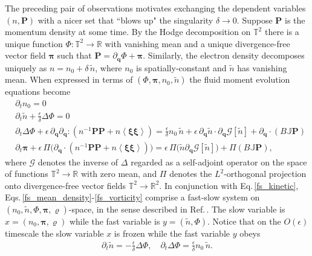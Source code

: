 \documentclass[%
 aip,
 amsmath,amssymb,
reprint, onecolumn %
]{revtex4-1}
\begin{document}
The preceding pair of observations motivates exchanging the dependent variables $(n,\bm{P})$ with a nicer set that ``blows up" the singularity $\delta\rightarrow 0$. Suppose $\bm{P}$ is the momentum density at some time. By the Hodge decomposition on $\mathbb{T}^2$ there is a unique function $\Phi:\mathbb{T}^2\rightarrow\mathbb{R}$ with vanishing mean and a unique divergence-free vector field $\bm{\pi}$ such that $\bm{P} =\partial_{\bm{q}}\Phi + \bm{\pi} $. Similarly, the electron density decomposes uniquely as $n = n_0 + \delta\,\widetilde{n}$, where $n_0$ is spatially-constant and $\widetilde{n}$ has vanishing mean. When expressed in terms of $(\Phi,\bm{\pi},n_0,\widetilde{n})$ the fluid moment evolution equations become
\begin{align}
&\partial_tn_0 = 0\label{fs_mean_density}\\
& \partial_t\widetilde{n} + \frac{\epsilon}{\delta}\Delta\Phi = 0\label{fs_continuity}\\
& \partial_t \Delta\Phi + \epsilon\,\partial_{\bm{q}}\partial_{\bm{q}}:(n^{-1}\bm{P}\bm{P} + n\left\langle\bm{\xi}\bm{\xi}\right\rangle) = \frac{\epsilon}{\delta}n_0\,\widetilde{n} + \epsilon\,\partial_{\bm{q}}\widetilde{n}\cdot \partial_{\bm{q}}\mathcal{G}[\widetilde{n}] + \partial_{\bm{q}}\cdot(B\mathbb{J}\bm{P})\label{fs_potential}\\
&\partial_t\bm{\pi} + \epsilon\,\Pi\bigg(\partial_{\bm{q}}\cdot(n^{-1}\bm{P}\bm{P} + n\left\langle \bm{\xi}\bm{\xi}\right\rangle)\bigg) = \epsilon\,\Pi\bigg(\widetilde{n}\partial_{\bm{q}}\mathcal{G}[\widetilde{n}]\bigg) + \Pi(B\mathbb{J}\bm{P}),\label{fs_vorticity}
\end{align}
where $\mathcal{G}$ denotes the inverse of $\Delta$ regarded as a self-adjoint operator on the space of functions $\mathbb{T}^2\rightarrow\mathbb{R}$ with zero mean, and $\Pi$ denotes the $L^2$-orthogonal projection onto divergence-free vector fields $\mathbb{T}^2\rightarrow\mathbb{R}^2$. In conjunction with Eq.\,\eqref{fs_kinetic}, Eqs.\,\eqref{fs_mean_density}-\eqref{fs_vorticity} comprise a fast-slow system on $(n_0,\widetilde{n},\Phi,\bm{\pi},\varrho)$-space, in the sense described in Ref.\,. The slow variable is $x=(n_0,\bm{\pi},\varrho)$ while the fast variable is $y = (\widetilde{n},\Phi)$. Notice that on the $O(\epsilon)$ timescale the slow variable $x$ is frozen while the fast variable $y$ obeys 
\begin{align}
\partial_t\widetilde{n} =  -\frac{\epsilon}{\delta}\Delta\Phi,\quad \partial_t\Delta\Phi = \frac{\epsilon}{\delta}n_0\,\widetilde{n}.\label{nearly-periodic}
\end{align}
\end{document}
